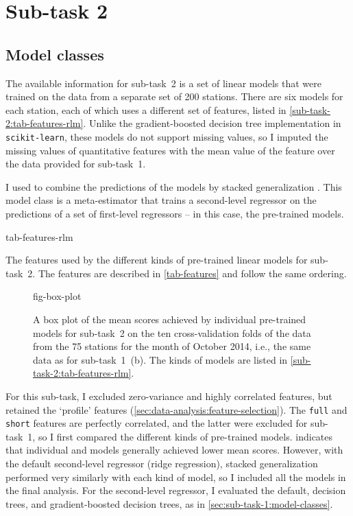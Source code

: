 
\section{Sub-task 2}
\label{sec:sub-task-2}

\subsection{Model classes}
\label{sec:sub-task-2:model-classes}

The available information for sub-task~2 is a set of linear models that were trained on
the data from a separate set of 200 stations.
There are six models for each station, each of which uses a different set of features,
listed in \cref{sub-task-2:tab-features-rlm}.
Unlike the gradient-boosted decision tree implementation in \texttt{scikit-learn},
these models do not support missing values, so I imputed the missing values of
quantitative features with the mean value of the feature over the data provided for
sub-task~1.

I used  to combine the predictions of the models
by stacked generalization \parencite{Wolpert1992}.
This model class is a meta-estimator that trains a second-level regressor on the
predictions of a set of first-level regressors -- in this case, the pre-trained models.

\begin{table}[!ht]
  \centering
  {tab-features-rlm}
  \caption{
    The features used by the different kinds of pre-trained linear models for sub-task~2.
    The features are described in \cref{tab-features} and follow the same ordering.
  }
  \label{sub-task-2:tab-features-rlm}
\end{table}

\begin{figure}
  \centering
  {fig-box-plot}
  \caption{
    A box plot of the mean scores achieved by individual pre-trained models for
    sub-task~2 on the ten cross-validation folds of the data from the 75 stations for
    the month of October 2014, i.e., the same data as for sub-task~1~(b).
    The kinds of models are listed in \cref{sub-task-2:tab-features-rlm}.
  }
  \label{sub-task-2:fig-box-plot}
\end{figure}

For this sub-task, I excluded zero-variance and highly correlated features, but
retained the `profile' features (\cref{sec:data-analysis:feature-selection}).
The \texttt{full} and \texttt{short} features are perfectly correlated, and the latter
were excluded for sub-task~1, so I first compared the different kinds of pre-trained
models.
 indicates that individual \rlmshort{} and \rlmshorttemp{} models
generally achieved lower mean scores.
However, with the default second-level regressor (ridge regression), stacked
generalization performed very similarly with each kind of model, so I included all the
models in the final analysis.
For the second-level regressor, I evaluated the default, decision trees, and
gradient-boosted decision trees, as in \cref{sec:sub-task-1:model-classes}.

